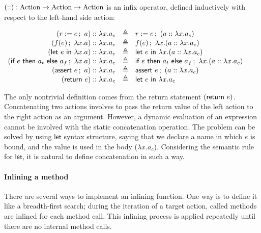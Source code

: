\begin{definition}
  \label{def-concataction}
  $(\concatsymb) : \textrm{Action} \to \textrm{Action} \to
  \textrm{Action}$ is an infix operator, defined inductively with
  respect to the left-hand side action:
  \begin{center}
    \begin{math}
      \begin{array}{rcl}
        \concataction{(\actwrite{r}{e}{a})}{a_c} & \triangleq & \actwrite{r}{e}{(\concataction{a}{a_c})} \\
        \concataction{(\actcall{x}{f}{e}{a})}{a_c} & \triangleq & \actcall{x}{f}{e}{(\concataction{a}{a_c})} \\
        \concataction{(\actlet{e}{x}{a})}{a_c} & \triangleq & \actlet{e}{x}{(\concataction{a}{a_c})} \\
        \concataction{(\actifelse{e}{a_t}{a_f}{x}{a})}{a_c} & \triangleq &
        \actifelse{e}{a_t}{a_f}{x}{(\concataction{a}{a_c})} \\
        \concataction{(\actassert{e}{a})}{a_c} & \triangleq & \actassert{e}{(\concataction{a}{a_c})} \\
        \concataction{(\actret{e})}{a_c} & \triangleq & \actlet{e}{x}{a_c} \\
      \end{array}
    \end{math}
  \end{center}
\end{definition}

The only nontrivial definition comes from the return statement
$(\actret{e})$. Concatenating two actions involves to pass the return
value of the left action to the right action as an argument. However,
a dynamic evaluation of an expression cannot be involved with the
static concatenation operation. The problem can be solved by using
$\textsf{let}$ syntax structure, saying that we declare a name in
which $e$ is bound, and the value is used in the body ($\lambda
x.a_c$). Considering the semantic rule for $\textsf{let}$, it is
natural to define concatenation in such a way.

\paragraph{Inlining a method}
There are several ways to implement an inlining function. One way is
to define it like a breadth-first search; during the iteration of a
target action, called methods are inlined for each method call. This
inlining process is applied repeatedly until there are no internal
method calls.


